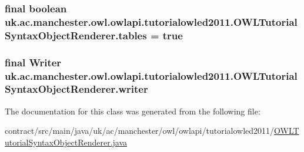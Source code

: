 \hypertarget{classuk_1_1ac_1_1manchester_1_1owl_1_1owlapi_1_1tutorialowled2011_1_1_o_w_l_tutorial_syntax_object_renderer_abdeba02f3a15280c069224129565d778}{
\subsubsection[{tables}]{\setlength{\rightskip}{0pt plus 5cm}final boolean uk.\-ac.\-manchester.\-owl.\-owlapi.\-tutorialowled2011.\-O\-W\-L\-Tutorial\-Syntax\-Object\-Renderer.\-tables = true\hspace{0.3cm}{\ttfamily [private]}}}\label{classuk_1_1ac_1_1manchester_1_1owl_1_1owlapi_1_1tutorialowled2011_1_1_o_w_l_tutorial_syntax_object_renderer_abdeba02f3a15280c069224129565d778}
\hypertarget{classuk_1_1ac_1_1manchester_1_1owl_1_1owlapi_1_1tutorialowled2011_1_1_o_w_l_tutorial_syntax_object_renderer_af9e3c9d1111b841a7e86b2ced68ff359}{
\subsubsection[{writer}]{\setlength{\rightskip}{0pt plus 5cm}final Writer uk.\-ac.\-manchester.\-owl.\-owlapi.\-tutorialowled2011.\-O\-W\-L\-Tutorial\-Syntax\-Object\-Renderer.\-writer\hspace{0.3cm}{\ttfamily [private]}}}\label{classuk_1_1ac_1_1manchester_1_1owl_1_1owlapi_1_1tutorialowled2011_1_1_o_w_l_tutorial_syntax_object_renderer_af9e3c9d1111b841a7e86b2ced68ff359}


The documentation for this class was generated from the following file\-:\begin{DoxyCompactItemize}
\item 
contract/src/main/java/uk/ac/manchester/owl/owlapi/tutorialowled2011/\hyperlink{main_2java_2uk_2ac_2manchester_2owl_2owlapi_2tutorialowled2011_2_o_w_l_tutorial_syntax_object_renderer_8java}{O\-W\-L\-Tutorial\-Syntax\-Object\-Renderer.\-java}\end{DoxyCompactItemize}
